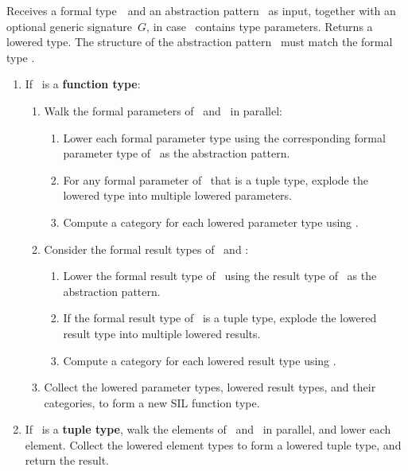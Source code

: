 \documentclass[../generics]{subfiles}
\begin{document}
\begin{algorithm}\label{alg:compute lowered type}
Receives a formal type~\tX\ and an abstraction pattern \tY\ as input, together with an optional generic signature~$G$, in case \tY\ contains type parameters. Returns a lowered type. The structure of the abstraction pattern \tY\ must match the formal type \tX.
\begin{enumerate}
\item If \tX\ is a \textbf{function type}:
\begin{enumerate}
\item Walk the formal parameters of \tX\ and \tY\ in parallel:
\begin{enumerate}
\item Lower each formal parameter type using the corresponding formal parameter type of \tY\ as the abstraction pattern.
\item For any formal parameter of \tY\ that is a tuple type, explode the lowered type into multiple lowered parameters.
\item Compute a category for each lowered parameter type using .
\end{enumerate}
\item Consider the formal result types of \tX\ and \tY:
\begin{enumerate}
\item Lower the formal result type of \tX\ using the result type of \tY\ as the abstraction pattern.
\item If the formal result type of \tY\ is a tuple type, explode the lowered result type into multiple lowered results.
\item Compute a category for each lowered result type using .
\end{enumerate}
\item Collect the lowered parameter types, lowered result types, and their categories, to form a new SIL function type.
\end{enumerate}

\item If \tX\ is a \textbf{tuple type}, walk the elements of \tX\ and \tY\ in parallel, and lower each element. Collect the lowered element types to form a lowered tuple type, and return the result.


\end{enumerate}
\end{algorithm}
\end{document}
